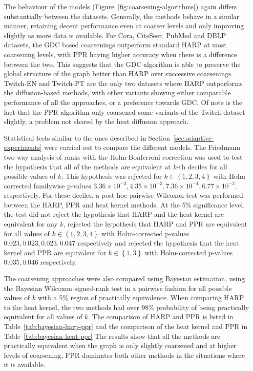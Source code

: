 The behaviour of the models (Figure~\ref{fig:coarsening-algorithms}) again differs substantially between the datasets. Generally, the methods behave in a similar manner, retaining decent performance even at coarser levels and only improving slightly as more data is available. For Cora, CiteSeer, PubMed and DBLP datasets, the GDC based coarsenings outperform standard HARP at most coarsening levels, with PPR having higher accuracy when there is a difference between the two. This suggests that the GDC algorithm is able to preserve the global structure of the graph better than HARP over successive coarsenings. Twitch-EN and Twitch-PT are the only two datasets where HARP outperforms the diffusion-based methods, with other variants showing either comparable performance of all the approaches, or a preference towards GDC. Of note is the fact that the PPR algorithm only coarsened some variants of the Twitch dataset slightly, a problem not shared by the heat diffusion approach.

Statistical tests similar to the ones described in Section~\ref{sec:adaptive-experiments} were carried out to compare the different models. The Friedmann two-way analysis of ranks with the Holm-Bonferroni correction was used to test the hypothesis that all of the methods are equivalent at \( k \)-th deciles for all possible values of \( k \). This hypothesis was rejected for \( k \in \left\{ 1, 2, 3, 4 \right\} \) with Holm-corrected familywise p-values \( 3.36 \times 10^{-3}, 4.35 \times 10^{-3}, 7.36 \times 10^{-4}, 6.77 \times 10^{-3} \), respectively. For these deciles, a post-hoc pairwise Wilcoxon test was performed between the HARP, PPR and heat kernel methods. At the 5\% significance level, the test did not reject the hypothesis that HARP and the heat kernel are equivalent for any \( k \), rejected the hypothesis that HARP and PPR are equivalent for all values of \( k \in \left\{ 1, 2, 3, 4 \right\} \) with Holm-corrected p-values \( 0.023, 0.023, 0.023, 0.047 \) respectively and rejected the hypothesis that the heat kernel and PPR are equivalent for \( k \in \left\{ 1, 3 \right\} \) with Holm-corrected p-values \( 0.035, 0.046 \) respectively.

The coarsening approaches were also compared using Bayesian estimation, using the Bayesian Wilcoxon signed-rank test in a pairwise fashion for all possible values of \( k \) with a 5\% region of practically equivalence. When comparing HARP to the heat kernel, the two methods had over 98\% probability of being practically equivalent for all values of \( k \). The comparison of HARP and PPR is listed in Table~\ref{tab:bayesian-harp-ppr} and the comparison of the heat kernel and PPR in Table~\ref{tab:bayesian-heat-ppr} The results show that all the methods are practically equivalent when the graph is only slightly coarsened and at higher levels of coarsening, PPR dominates both other methods in the situations where it is available.

